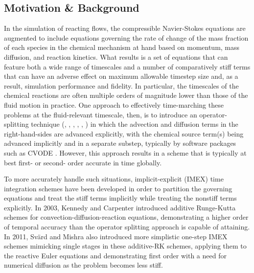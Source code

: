 \subsection{Motivation \& Background} \label{sec:timeint_bg}


In the simulation of reacting flows, the compressible Navier-Stokes
equations are augmented to include equations governing the rate of
change of the mass fraction of each species in the chemical mechanism
at hand based on momentum, mass diffusion, and reaction kinetics. What
results is a set of equations that can feature both a wide range of
timescales and a number of comparatively stiff terms that can have
an adverse effect on maximum allowable timestep size and, as a result,
simulation performance and fidelity. In particular, the timescales
of the chemical reactions are often multiple orders of magnitude lower
than those of the fluid motion in practice. One approach to effectively
time-marching these problems at the fluid-relevant timescale, then, is
to introduce an operator-splitting technique (\cite{sportisse2000method},
\cite{strang1968construction}, \cite{lapointe2020data}, \cite{macart2016semi},
\cite{ren2008second}, \cite{knio1999semi}) in which the advection
and diffusion terms in the right-hand-sides are advanced explicitly,
with the chemical source term(s) being advanced implicitly and
in a separate substep, typically by software packages such as CVODE \cite{cohen1996cvode}.
However, this approach results in a scheme that is typically at best
first- or second- order accurate in time globally.

To more accurately handle such situations, implicit-explicit (IMEX) time
integration schemes have been developed in order to partition the
governing equations and treat the stiff terms implicitly while treating
the nonstiff terms explicitly. In 2003, Kennedy and Carpenter \cite{kennedy2003additive}
introduced additive Runge-Kutta schemes for convection-diffusion-reaction equations,
demonstrating a higher order of temporal accuracy than the operator splitting
approach is capable of attaining. In 2011, Sv{\"a}rd and Mishra \cite{svard2011implicit}
also introduced more simplistic one-step IMEX schemes mimicking single stages in these
additive-RK schemes, applying them to the reactive Euler equations and
demonstrating first order with a need for numerical diffusion as the problem
becomes less stiff.

